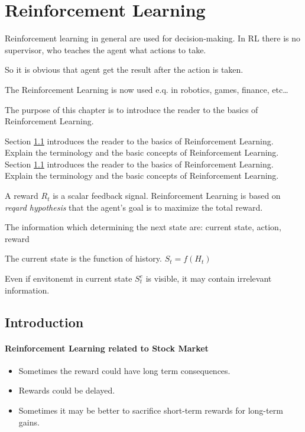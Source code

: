 \chapter{Reinforcement Learning}\label{ch:reinforcement-learning}
Reinforcement learning in general are used for decision-making.
In RL there is no supervisor, who teaches the agent what actions to take.

So it is obvious that agent get the result after the action is taken.

The Reinforcement Learning is now used e.q. in robotics, games, finance, etc\ldots


The purpose of this chapter is to introduce the reader to the basics of Reinforcement Learning.

Section \ref{sec:rl-introduction} introduces the reader to the basics of Reinforcement Learning.
Explain the terminology and the basic concepts of Reinforcement Learning.
Section \ref{sec:rl-introduction} introduces the reader to the basics of Reinforcement Learning.
Explain the terminology and the basic concepts of Reinforcement Learning.

A reward $R_t$ is a scalar feedback signal.
Reinforcement Learning is based on \textit{reqard hypothesis} that the agent's goal is to maximize the total reward.

The information which determining the next state are: current state, action, reward

The current state is the function of history.
$S_t = f(H_t)$

Even if envitonemt in current state $S_{t}^{e}$ is visible, it may contain irrelevant information.


\section{Introduction}\label{sec:rl-introduction}

\subsubsection{Reinforcement Learning related to Stock Market}\label{subsec:rl-introduction}
\begin{itemize}
    \item Sometimes the reward could have long term consequences.
    \item Rewards could be delayed.
    \item Sometimes it may be better to sacrifice short-term rewards for long-term gains.
\end{itemize}

